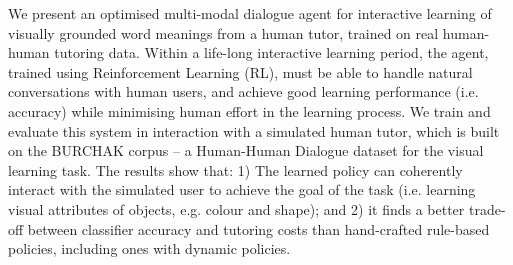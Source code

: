 We present an optimised multi-modal dialogue agent for interactive learning of visually grounded word meanings from a human tutor, trained on real human-human tutoring data. Within a life-long interactive learning period, the agent, trained using Reinforcement Learning (RL), must be able to handle natural conversations with human users, and achieve  good learning performance (i.e. accuracy) while minimising human effort in the learning process. We train and evaluate this  system in interaction with a simulated human tutor, which is built on the BURCHAK corpus -- a Human-Human Dialogue dataset for the visual learning task. The results show that: 1) The learned policy can coherently interact with the simulated user to achieve the goal of the task (i.e. learning visual attributes of  objects, e.g. colour and shape); and 2) it finds a better trade-off between  classifier accuracy and tutoring costs than hand-crafted rule-based policies, including ones with dynamic policies.
